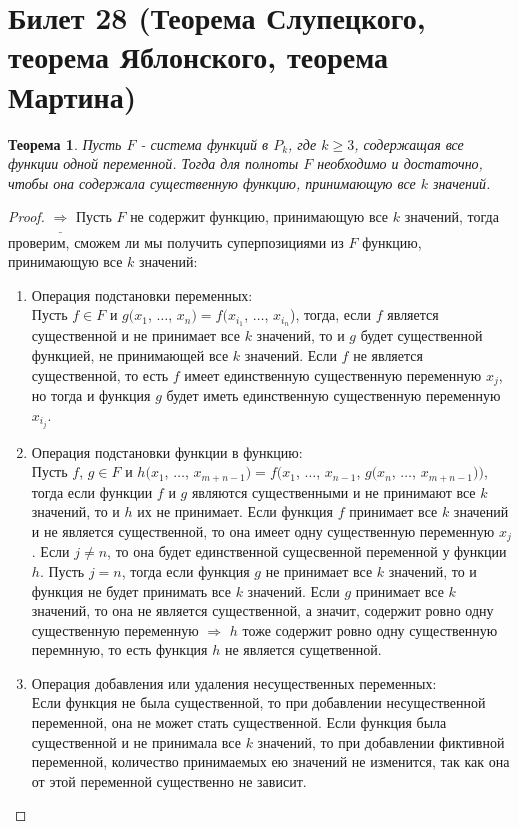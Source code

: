 \documentclass[a4paper, 12pt]{article}
\theoremstyle{definition}
\theoremstyle{plain}
\newtheorem*{theorem}{Теорема}
\theoremstyle{remark}
\begin{document}
  \section{Билет 28 (Теорема Слупецкого, теорема Яблонского, теорема Мартина)}
  \begin{theorem}
    Пусть $F$ - система функций в $P_k$, где $k\geqslant3$, содержащая все функции одной переменной. Тогда для полноты $F$ необходимо и достаточно, чтобы она содержала существенную функцию, принимающую все $k$ значений.
  \end{theorem}
  \begin{proof}
    $\underline{\Longrightarrow}$ Пусть $F$ не содержит функцию, принимающую все $k$ значений, тогда проверим, сможем ли мы получить суперпозициями из $F$ функцию, принимающую все $k$ значений:\\
    \begin{enumerate}
      \item Операция подстановки переменных:\\
      Пусть $f\in F$ и $g(x_1$, $\ldots$, $x_n)=f(x_{i_1}$, $\ldots$, $x_{i_n}$), тогда, если $f$ является существенной и не принимает все $k$ значений, то и $g$ будет существенной функцией, не принимающей все $k$ значений. Если $f$ не является существенной, то есть $f$ имеет единственную существенную переменную $x_j$, но тогда и функция $g$ будет иметь единственную существенную переменную $x_{i_j}$.
      \item Операция подстановки функции в функцию:\\
      Пусть $f$, $g\in F$ и $h(x_1$, $\ldots$, $x_{m+n-1})=f(x_1$, $\ldots$, $x_{n-1}$, $g(x_n$, $\ldots$, $x_{m+n-1}))$, тогда если функции $f$ и $g$ являются существенными и не принимают все $k$ значений, то и $h$ их не принимает. Если функция $f$ принимает все $k$ значений и не является существенной, то она имеет одну существенную переменную $x_j$. Если $j\neq n$, то она будет единственной сущесвенной переменной у функции $h$. Пусть $j=n$, тогда если функция $g$ не принимает все $k$ значений, то и функция не будет принимать все $k$ значений. Если $g$ принимает все $k$ значений, то она не является существенной, а значит, содержит ровно одну существенную переменную $\Longrightarrow$ $h$ тоже содержит ровно одну существенную перемнную, то есть функция $h$ не является сущетвенной.
      \item Операция добавления или удаления несущественных переменных:\\
      Если функция не была существенной, то при добавлении несущественной переменной, она не может стать существенной. Если функция была существенной и не принимала все $k$ значений, то при добавлении фиктивной переменной, количество принимаемых ею значений не изменится, так как она от этой переменной существенно не зависит.

\end{enumerate}
\end{proof}
\end{document}
